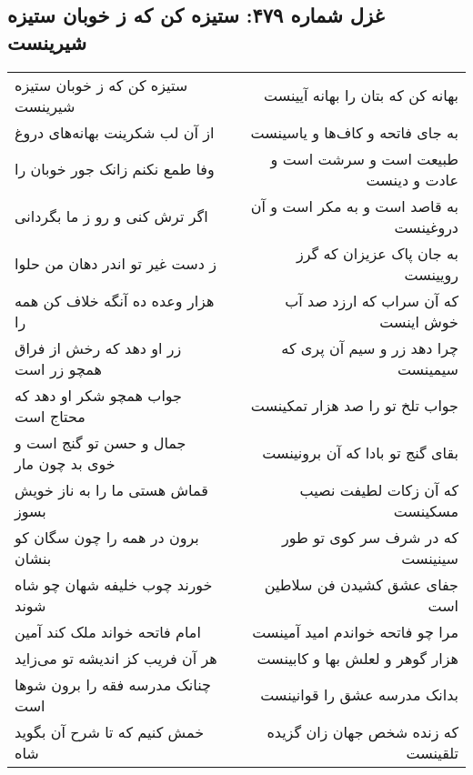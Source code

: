 \begin{center}
\section*{غزل شماره ۴۷۹: ستیزه کن که ز خوبان ستیزه شیرینست}
\label{sec:0479}
\begin{longtable}{l p{0.5cm} r}
ستیزه کن که ز خوبان ستیزه شیرینست
&&
بهانه کن که بتان را بهانه آیینست
\\
از آن لب شکرینت بهانه‌های دروغ
&&
به جای فاتحه و کاف‌ها و یاسینست
\\
وفا طمع نکنم زانک جور خوبان را
&&
طبیعت است و سرشت است و عادت و دینست
\\
اگر ترش کنی و رو ز ما بگردانی
&&
به قاصد است و به مکر است و آن دروغینست
\\
ز دست غیر تو اندر دهان من حلوا
&&
به جان پاک عزیزان که گرز رویینست
\\
هزار وعده ده آنگه خلاف کن همه را
&&
که آن سراب که ارزد صد آب خوش اینست
\\
زر او دهد که رخش از فراق همچو زر است
&&
چرا دهد زر و سیم آن پری که سیمینست
\\
جواب همچو شکر او دهد که محتاج است
&&
جواب تلخ تو را صد هزار تمکینست
\\
جمال و حسن تو گنج است و خوی بد چون مار
&&
بقای گنج تو بادا که آن برونینست
\\
قماش هستی ما را به ناز خویش بسوز
&&
که آن زکات لطیفت نصیب مسکینست
\\
برون در همه را چون سگان کو بنشان
&&
که در شرف سر کوی تو طور سینینست
\\
خورند چوب خلیفه شهان چو شاه شوند
&&
جفای عشق کشیدن فن سلاطین است
\\
امام فاتحه خواند ملک کند آمین
&&
مرا چو فاتحه خواندم امید آمینست
\\
هر آن فریب کز اندیشه تو می‌زاید
&&
هزار گوهر و لعلش بها و کابینست
\\
چنانک مدرسه فقه را برون شوها است
&&
بدانک مدرسه عشق را قوانینست
\\
خمش کنیم که تا شرح آن بگوید شاه
&&
که زنده شخص جهان زان گزیده تلقینست
\\
\end{longtable}
\end{center}
